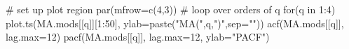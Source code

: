 \begin{Schunk}
\begin{Sinput}
 # set up plot region
 par(mfrow=c(4,3))
 # loop over orders of q
 for(q in 1:4) {
   plot.ts(MA.mods[[q]][1:50],
           ylab=paste("MA(",q,")",sep=""))
   acf(MA.mods[[q]], lag.max=12)
   pacf(MA.mods[[q]], lag.max=12, ylab="PACF")
 }
\end{Sinput}
\end{Schunk}
